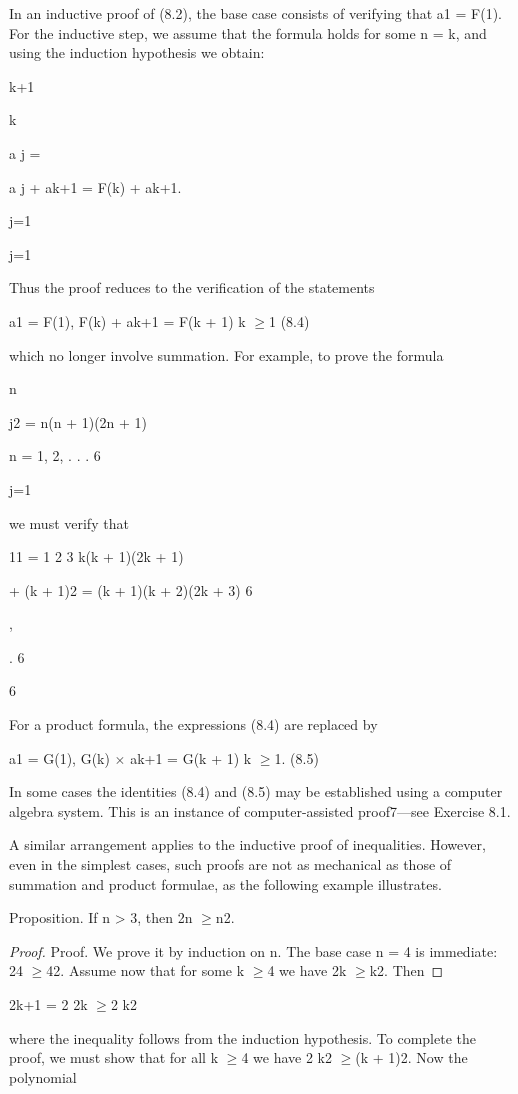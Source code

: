 \documentclass[11pt]{article}
\theoremstyle{plain}
\theoremstyle{definition}
\begin{document}
In an inductive proof of (8.2), the base case consists of verifying that a1 = F(1). For the inductive step, we assume that the formula holds for some n = k, and using the induction hypothesis we obtain:

k+1

k

a j =

a j + ak+1 = F(k) + ak+1.

j=1

j=1

Thus the proof reduces to the verification of the statements

a1 = F(1), F(k) + ak+1 = F(k + 1) k $\geq$1 (8.4)

which no longer involve summation. For example, to prove the formula

n

j2 = n(n + 1)(2n + 1)

n = 1, 2, . . . 6

j=1

we must verify that

11 = 1 \textperiodcentered{} 2 \textperiodcentered{} 3 k(k + 1)(2k + 1)

+ (k + 1)2 = (k + 1)(k + 2)(2k + 3) 6

,

. 6

6

For a product formula, the expressions (8.4) are replaced by

a1 = G(1), G(k) $\times$ ak+1 = G(k + 1) k $\geq$1. (8.5)

In some cases the identities (8.4) and (8.5) may be established using a computer algebra system. This is an instance of computer-assisted proof7---see Exercise 8.1.

A similar arrangement applies to the inductive proof of inequalities. However, even in the simplest cases, such proofs are not as mechanical as those of summation and product formulae, as the following example illustrates.

Proposition. If n > 3, then 2n $\geq$n2.

\begin{proof}
Proof. We prove it by induction on n. The base case n = 4 is immediate: 24 $\geq$42. Assume now that for some k $\geq$4 we have 2k $\geq$k2. Then
\end{proof}

2k+1 = 2 \textperiodcentered{} 2k $\geq$2 \textperiodcentered{} k2

where the inequality follows from the induction hypothesis. To complete the proof, we must show that for all k $\geq$4 we have 2 \textperiodcentered{} k2 $\geq$(k + 1)2. Now the polynomial
\end{document}
